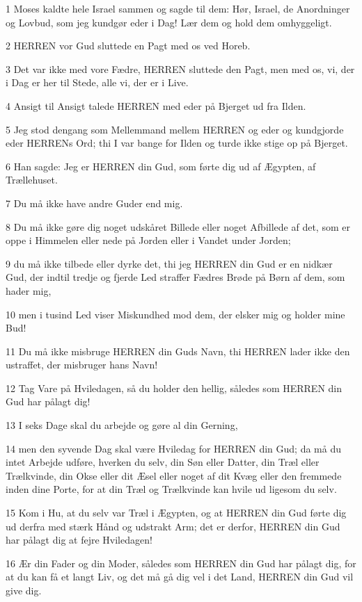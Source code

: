\par 1 Moses kaldte hele Israel sammen og sagde til dem: Hør, Israel, de Anordninger og Lovbud, som jeg kundgør eder i Dag! Lær dem og hold dem omhyggeligt.
\par 2 HERREN vor Gud sluttede en Pagt med os ved Horeb.
\par 3 Det var ikke med vore Fædre, HERREN sluttede den Pagt, men med os, vi, der i Dag er her til Stede, alle vi, der er i Live.
\par 4 Ansigt til Ansigt talede HERREN med eder på Bjerget ud fra Ilden.
\par 5 Jeg stod dengang som Mellemmand mellem HERREN og eder og kundgjorde eder HERRENs Ord; thi I var bange for Ilden og turde ikke stige op på Bjerget.
\par 6 Han sagde: Jeg er HERREN din Gud, som førte dig ud af Ægypten, af Trællehuset.
\par 7 Du må ikke have andre Guder end mig.
\par 8 Du må ikke gøre dig noget udskåret Billede eller noget Afbillede af det, som er oppe i Himmelen eller nede på Jorden eller i Vandet under Jorden;
\par 9 du må ikke tilbede eller dyrke det, thi jeg HERREN din Gud er en nidkær Gud, der indtil tredje og fjerde Led straffer Fædres Brøde på Børn af dem, som hader mig,
\par 10 men i tusind Led viser Miskundhed mod dem, der elsker mig og holder mine Bud!
\par 11 Du må ikke misbruge HERREN din Guds Navn, thi HERREN lader ikke den ustraffet, der misbruger hans Navn!
\par 12 Tag Vare på Hviledagen, så du holder den hellig, således som HERREN din Gud har pålagt dig!
\par 13 I seks Dage skal du arbejde og gøre al din Gerning,
\par 14 men den syvende Dag skal være Hviledag for HERREN din Gud; da må du intet Arbejde udføre, hverken du selv, din Søn eller Datter, din Træl eller Trælkvinde, din Okse eller dit Æsel eller noget af dit Kvæg eller den fremmede inden dine Porte, for at din Træl og Trælkvinde kan hvile ud ligesom du selv.
\par 15 Kom i Hu, at du selv var Træl i Ægypten, og at HERREN din Gud førte dig ud derfra med stærk Hånd og udstrakt Arm; det er derfor, HERREN din Gud har pålagt dig at fejre Hviledagen!
\par 16 Ær din Fader og din Moder, således som HERREN din Gud har pålagt dig, for at du kan få et langt Liv, og det må gå dig vel i det Land, HERREN din Gud vil give dig.
